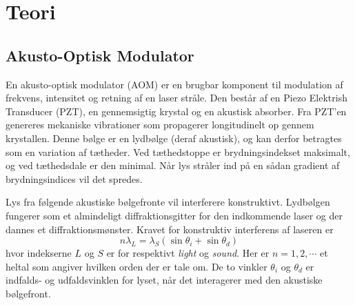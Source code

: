 \documentclass[main]{subfiles}
\begin{document}
\section{Teori}
%

\subsection{Akusto-Optisk Modulator}
En akusto-optisk modulator (AOM) er en brugbar komponent til modulation af frekvens, intensitet og retning af en laser stråle. Den består af en Piezo Elektrish Transducer (PZT), en gennemsigtig krystal og en akustisk absorber. Fra PZT'en genereres mekaniske vibrationer som propagerer longitudinelt op gennem krystallen. Denne bølge er en lydbølge (deraf akustisk), og kan derfor betragtes som en variation af tætheder. Ved tæthedstoppe er brydningsindekset maksimalt, og ved tæthedsdale er den minimal. Når lys stråler ind på en sådan gradient af brydningsindices vil det spredes.

Lys fra følgende akustiske bølgefronte vil interferere konstruktivt. Lydbølgen fungerer som et almindeligt diffraktionsgitter for den indkommende laser og der dannes et diffraktionsmønster.
Kravet for konstruktiv interferens af laseren er
\begin{equation}
    n\lambda_L = \lambda_S \left( \sin\theta_i + \sin\theta_d \right)
    \label{reduktion}
\end{equation}
hvor indekserne $L$ og $S$ er for respektivt \emph{light} og \emph{sound}. Her er $n=1,2,\cdots$ et heltal som angiver hvilken orden der er tale om. De to vinkler $\theta_i$ og $\theta_d$ er indfalds- og udfaldsvinklen for lyset, når det interagerer med den akustiske bølgefront.
\end{document}
